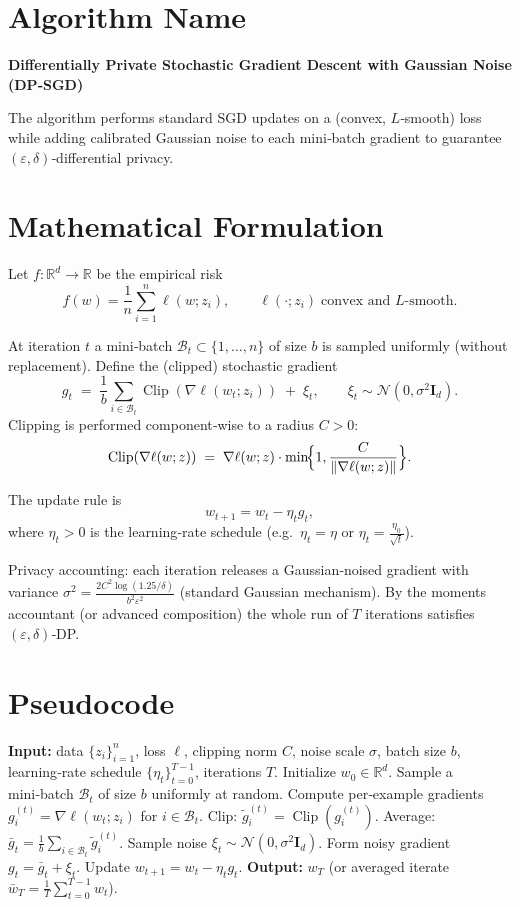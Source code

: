 \documentclass{article}
\newcommand{\R}{\mathbb{R}}
\newcommand{\norm}[1]{\left\|#1\right\|}
\newcommand{\grad}{\nabla}
\newcommand{\clip}[1]{\operatorname{Clip}\!\left(#1\right)}
\begin{document}
\section*{Algorithm Name}
\textbf{Differentially Private Stochastic Gradient Descent with Gaussian Noise (DP‑SGD)}  

The algorithm performs standard SGD updates on a (convex, $L$‑smooth) loss while adding calibrated Gaussian noise to each mini‑batch gradient to guarantee $(\varepsilon,\delta)$‑differential privacy.

\section*{Mathematical Formulation}
Let $f:\R^{d}\to\R$ be the empirical risk
\[
f(w)=\frac{1}{n}\sum_{i=1}^{n}\ell(w;z_i),\qquad 
\ell(\cdot;z_i)\;\text{convex and $L$‑smooth}.
\]

At iteration $t$ a mini‑batch $\mathcal{B}_t\subset\{1,\dots,n\}$ of size $b$ is sampled uniformly
(without replacement).  
Define the (clipped) stochastic gradient
\[
g_t\;=\;\frac{1}{b}\sum_{i\in\mathcal{B}_t}\clip{\grad\ell(w_t;z_i)}\;+\;\xi_t,
\qquad 
\xi_t\sim\mathcal{N}(0,\sigma^{2}\mathbf{I}_d).
\]
Clipping is performed component‑wise to a radius $C>0$:
\[
\clip{\grad\ell(w;z)}\;=\;
\grad\ell(w;z)\cdot\min\!\Bigl\{1,\frac{C}{\norm{\grad\ell(w;z)}}\Bigr\}.
\]

The update rule is
\[
\boxed{w_{t+1}=w_t-\eta_t g_t},
\]
where $\eta_t>0$ is the learning‑rate schedule (e.g.\ $\eta_t=\eta$ or $\eta_t=\frac{\eta_0}{\sqrt{t}}$).

Privacy accounting: each iteration releases a Gaussian‑noised gradient with variance
$\sigma^{2}=\frac{2C^{2}\log(1.25/\delta)}{b^{2}\varepsilon^{2}}$
(standard Gaussian mechanism).  By the moments accountant (or advanced composition) the whole run of $T$ iterations satisfies $(\varepsilon,\delta)$‑DP.

\section*{Pseudocode}
\begin{algorithm}[H]
\caption{DP‑SGD}
\begin{algorithmic}[1]
\State \textbf{Input:} data $\{z_i\}_{i=1}^{n}$, loss $\ell$, clipping norm $C$, noise scale $\sigma$, batch size $b$, learning‑rate schedule $\{\eta_t\}_{t=0}^{T-1}$, iterations $T$.
\State Initialize $w_0\in\R^{d}$.
    \State Sample a mini‑batch $\mathcal{B}_t$ of size $b$ uniformly at random.
    \State Compute per‑example gradients $g_i^{(t)}=\grad\ell(w_t;z_i)$ for $i\in\mathcal{B}_t$.
    \State Clip: $\tilde g_i^{(t)}=\clip{g_i^{(t)}}$.
    \State Average: $\bar g_t=\frac{1}{b}\sum_{i\in\mathcal{B}_t}\tilde g_i^{(t)}$.
    \State Sample noise $\xi_t\sim\mathcal{N}(0,\sigma^{2}\mathbf{I}_d)$.
    \State Form noisy gradient $g_t=\bar g_t+\xi_t$.
    \State Update $w_{t+1}=w_t-\eta_t g_t$.
\EndFor
\State \textbf{Output:} $w_T$ (or averaged iterate $\bar w_T=\frac{1}{T}\sum_{t=0}^{T-1}w_t$).
\end{algorithmic}
\end{algorithm}
\end{document}

